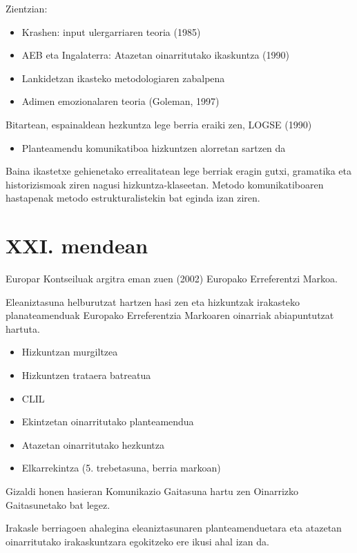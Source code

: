 \documentclass[
]{book}
\providecommand{\tightlist}{%
  \setlength{\itemsep}{0pt}\setlength{\parskip}{0pt}}
\begin{document}
Zientzian:

\begin{itemize}
\tightlist
\item
  Krashen: input ulergarriaren teoria (1985)
\item
  AEB eta Ingalaterra: Atazetan oinarritutako ikaskuntza (1990)
\item
  Lankidetzan ikasteko metodologiaren zabalpena
\item
  Adimen emozionalaren teoria (Goleman, 1997)
\end{itemize}

Bitartean, espainaldean hezkuntza lege berria eraiki zen, LOGSE (1990)

\begin{itemize}
\tightlist
\item
  Planteamendu komunikatiboa hizkuntzen alorretan sartzen da
\end{itemize}

Baina ikastetxe gehienetako errealitatean lege berriak eragin gutxi, gramatika eta historizismoak ziren nagusi hizkuntza-klaseetan. Metodo komunikatiboaren hastapenak metodo estrukturalistekin bat eginda izan ziren.

\hypertarget{xxi.-mendean}{%
\section{XXI. mendean}\label{xxi.-mendean}}

Europar Kontseiluak argitra eman zuen (2002) Europako Erreferentzi Markoa.

Eleaniztasuna helburutzat hartzen hasi zen eta hizkuntzak irakasteko planateamenduak Europako Erreferentzia Markoaren oinarriak abiapuntutzat hartuta.

\begin{itemize}
\tightlist
\item
  Hizkuntzan murgiltzea
\item
  Hizkuntzen trataera batreatua
\item
  CLIL
\item
  Ekintzetan oinarritutako planteamendua
\item
  Atazetan oinarritutako hezkuntza
\item
  Elkarrekintza (5. trebetasuna, berria markoan)
\end{itemize}

Gizaldi honen hasieran Komunikazio Gaitasuna hartu zen Oinarrizko Gaitasunetako bat legez.

Irakasle berriagoen ahalegina eleaniztasunaren planteamenduetara eta atazetan oinarritutako irakaskuntzara egokitzeko ere ikusi ahal izan da.
\end{document}
